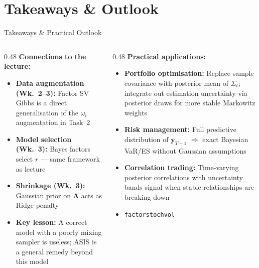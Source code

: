 \documentclass[10pt]{beamer}\usepackage[]{graphicx}\usepackage[table]{xcolor}
\begin{document}

\section{Takeaways \& Outlook}

\begin{frame}{Takeaways \& Practical Outlook}

  \begin{columns}[T]
    \begin{column}{0.48\textwidth}
      \textbf{Connections to the lecture:}
      \begin{itemize}
        \setlength\itemsep{0.45em}
        \item \textbf{Data augmentation (Wk.~2--3):}
              Factor SV Gibbs is a direct generalisation
              of the $\omega_i$ augmentation in Task~2
        \item \textbf{Model selection (Wk.~3):}
              Bayes factors select $r$ ---
              same framework as lecture
        \item \textbf{Shrinkage (Wk.~3):}
              Gaussian prior on $\boldsymbol{\Lambda}$
              acts as Ridge penalty
        \item \textbf{Key lesson:} A correct model with a
              poorly mixing sampler is useless;
              ASIS is a general remedy beyond this model
      \end{itemize}
    \end{column}
    \begin{column}{0.48\textwidth}
      \textbf{Practical applications:}
      \begin{itemize}
        \setlength\itemsep{0.45em}
        \item \textbf{Portfolio optimisation:}
              Replace sample covariance with posterior mean
              of $\Sigma_t$; integrate out estimation
              uncertainty via posterior draws for more
              stable Markowitz weights
        \item \textbf{Risk management:}
              Full predictive distribution of $\mathbf{y}_{T+1}$
              $\Rightarrow$ exact Bayesian VaR/ES without
              Gaussian assumptions
        \item \textbf{Correlation trading:}
              Time-varying posterior correlations with
              uncertainty bands signal when stable
              relationships are breaking down
        \item \texttt{factorstochvol}
      \end{itemize}
    \end{column}
  \end{columns}

\end{frame}
\end{document}
